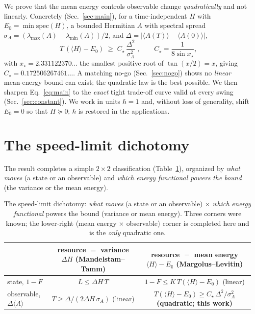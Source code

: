 \documentclass[aps,pra,twocolumn,superscriptaddress,nofootinbib,longbibliography]{revtex4-2}
\newcommand{\Ctrue}{C_{\star}}
\newcommand{\xstar}{x_{\star}}
\newcommand{\mean}[1]{\langle #1 \rangle}
\begin{document}
We prove that the mean energy controls observable change \emph{quadratically} and not linearly. Concretely
(Sec.~\ref{sec:main}), for a time-independent $H$ with $E_0=\min\mathrm{spec}(H)$, a bounded Hermitian $A$
with spectral spread $\sigma_A=(\lambda_{\max}(A)-\lambda_{\min}(A))/2$, and $\Delta=|\mean{A(T)}-\mean{A(0)}|$,
\begin{equation}
\boxed{\;T\,(\mean{H}-E_0)\;\ge\;\Ctrue\,\frac{\Delta^2}{\sigma_A^2}\;},
\qquad \Ctrue=\frac{1}{8\sin \xstar},
\label{eq:main}
\end{equation}
with $\xstar=2.331122370\ldots$ the smallest positive root of $\tan(x/2)=x$, giving
$\Ctrue=0.172506267461\ldots$. A matching no-go (Sec.~\ref{sec:nogo}) shows no \emph{linear} mean-energy
bound can exist; the quadratic law is the best possible. We then sharpen Eq.~\eqref{eq:main} to the
\emph{exact} tight trade-off curve valid at every swing (Sec.~\ref{sec:constant}). We work in units $\hbar=1$ and, without loss of
generality, shift $E_0=0$ so that $H\succeq0$; $\hbar$ is restored in the applications.

\section{The speed-limit dichotomy}
\label{sec:dichotomy}
The result completes a simple $2\times2$ classification (Table~\ref{tab:dichotomy}), organized by
\emph{what moves} (a state or an observable) and \emph{which energy functional powers the bound} (the
variance or the mean energy).

\begin{table}[t]
\renewcommand{\arraystretch}{1.6}
\begin{ruledtabular}
\begin{tabular}{lcc}
 & resource $=$ variance $\Delta H$ (Mandelstam--Tamm) & resource $=$ mean energy $\mean{H}-E_0$ (Margolus--Levitin)\\
\hline
state, $1-F$ & $L\le \Delta H\,T$ & $1-F\le K\,T(\mean{H}-E_0)$ \quad (linear)\\
observable, $\Delta\mean{A}$ & $T\ge \Delta/(2\Delta H\,\sigma_A)$ \quad (linear) & $T(\mean{H}-E_0)\ge \Ctrue\,\Delta^2/\sigma_A^2$ \quad \textbf{(quadratic; this work)}\\
\end{tabular}
\end{ruledtabular}
\caption{The speed-limit dichotomy: \emph{what moves} (a state or an observable) $\times$ \emph{which energy
functional} powers the bound (variance or mean energy). Three corners were known; the lower-right
(mean energy $\times$ observable) corner is completed here and is the \emph{only} quadratic one.}
\label{tab:dichotomy}
\end{table}
\end{document}
